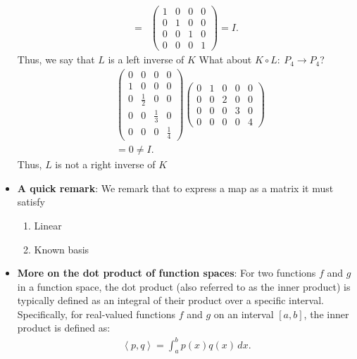 \documentclass{report}
\begin{document}
\begin{itemize}
\begin{align*}
                =&\begin{pmatrix}
                    1 & 0 & 0 & 0 \\ 0 & 1 & 0 & 0 \\ 0 & 0 & 1 & 0 \\ 0 & 0 & 0  & 1
                \end{pmatrix} = I
            .\end{align*}
            Thus, we say that $L$ is a left inverse of $K$
            \bigbreak \noindent 
            What about $K\circ L:\ P_{4} \to P_{4}$?
            \begin{align*}
                 &\begin{pmatrix} 0 & 0 & 0 & 0\\ 1 & 0 & 0 & 0\\ 0 & \frac{1}{2} & 0 & 0 \\ 0 & 0 &  \frac{1}{3} & 0 \\ 0 & 0 & 0 & \frac{1}{4} \end{pmatrix}                 \begin{pmatrix} 0 & 1 & 0 & 0 & 0 \\ 0 & 0 & 2 & 0 & 0 \\ 0 & 0&0&3 & 0 \\ 0 & 0 & 0 & 0 & 4 \end{pmatrix} \\
                 &=0 \ne I
            .\end{align*}
            \bigbreak \noindent 
            Thus, $L$ is not a right inverse of $K$
        \item \textbf{A quick remark}: We remark that to express a map as a matrix it must satisfy
            \begin{enumerate}
                \item Linear
                \item Known basis
            \end{enumerate}
        \item \textbf{More on the dot product of function spaces}: For two functions \( f \) and \( g \) in a function space, the dot product (also referred to as the inner product) is typically defined as an integral of their product over a specific interval. Specifically, for real-valued functions \( f \) and \( g \) on an interval \([a, b]\), the inner product is defined as:
            \begin{align*}
                \left\langle p, q \right\rangle = \int_{a}^{b} p(x)q(x) \, dx
            .\end{align*}

\end{itemize}
\end{document}
